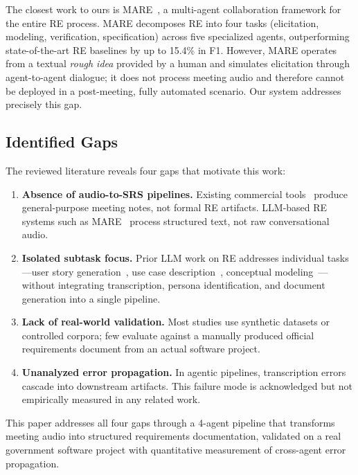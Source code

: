 \documentclass[sigconf]{acmart}
\begin{document}
The closest work to ours is MARE~\cite{jin2024mare}, a multi-agent
collaboration framework for the entire RE process. MARE decomposes RE
into four tasks (elicitation, modeling, verification, specification)
across five specialized agents, outperforming state-of-the-art RE
baselines by up to 15.4\% in F1. However, MARE operates from a
textual \textit{rough idea} provided by a human and simulates
elicitation through agent-to-agent dialogue; it does not process
meeting audio and therefore cannot be deployed in a post-meeting,
fully automated scenario. Our system addresses precisely this gap.

\subsection{Identified Gaps}

The reviewed literature reveals four gaps that motivate this work:

\begin{enumerate}
  \item \textbf{Absence of audio-to-SRS pipelines.} Existing
        commercial tools~\cite{fellow2025,jamie2025} produce
        general-purpose meeting notes, not formal RE artifacts. LLM-based
        RE systems such as MARE~\cite{jin2024mare} process structured
        text, not raw conversational audio.

  \item \textbf{Isolated subtask focus.} Prior LLM work on RE addresses
        individual tasks—user story generation~\cite{delgado2024aidriven},
        use case description~\cite{naimi2024automating}, conceptual
        modeling~\cite{ren2024combining}—without integrating
        transcription, persona identification, and document generation
        into a single pipeline.

  \item \textbf{Lack of real-world validation.} Most studies use
        synthetic datasets or controlled corpora; few evaluate against a
        manually produced official requirements document from an actual
        software project.

  \item \textbf{Unanalyzed error propagation.} In agentic pipelines,
        transcription errors cascade into downstream artifacts. This
        failure mode is acknowledged but not empirically measured in any
        related work.
\end{enumerate}

This paper addresses all four gaps through a 4-agent pipeline that
transforms meeting audio into structured requirements documentation,
validated on a real government software project with quantitative
measurement of cross-agent error propagation.
\end{document}
